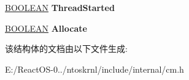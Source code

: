 \begin{DoxyCompactItemize}
\item 
\mbox{\label{struct___h_i_v_e___l_i_s_t___e_n_t_r_y_a160fbd53391fc8ffb41a35a4060bfd10}} 
\hyperlink{_processor_bind_8h_a112e3146cb38b6ee95e64d85842e380a}{B\+O\+O\+L\+E\+AN} {\bfseries Thread\+Started}
\item 
\mbox{\label{struct___h_i_v_e___l_i_s_t___e_n_t_r_y_a5770e4c2a1e6a277fb66350d9837b84a}} 
\hyperlink{_processor_bind_8h_a112e3146cb38b6ee95e64d85842e380a}{B\+O\+O\+L\+E\+AN} {\bfseries Allocate}
\end{DoxyCompactItemize}


该结构体的文档由以下文件生成\+:\begin{DoxyCompactItemize}
\item 
E\+:/\+React\+O\+S-\/0../ntoskrnl/include/internal/cm.\+h\end{DoxyCompactItemize}
